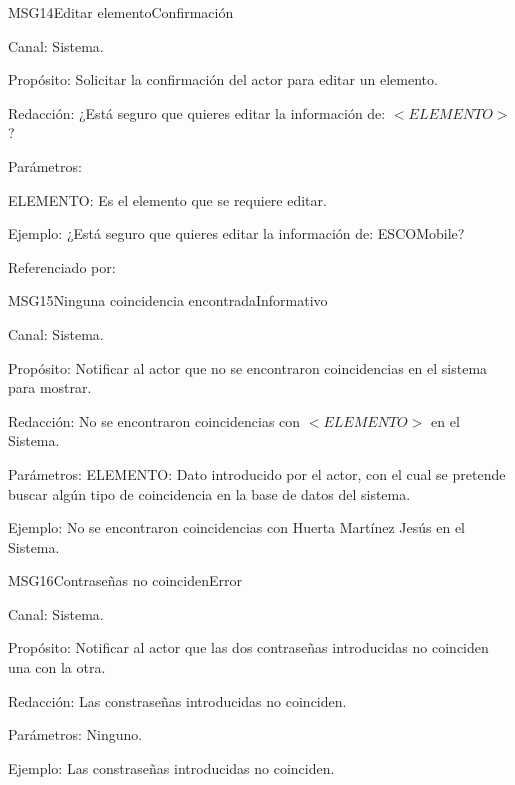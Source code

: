 \begin{mensaje}{MSG14}{Editar elemento}{Confirmación}
	\item[Canal:] Sistema.
    \item[Propósito:] Solicitar la confirmación del actor para editar un elemento.
    \item[Redacción:] ¿Está seguro que quieres editar la información de: $<ELEMENTO>$?
    \item[Parámetros:] \item ELEMENTO: Es el elemento que se requiere editar.
    \item[Ejemplo:] ¿Está seguro que quieres editar la información de: ESCOMobile?
	\item[Referenciado por: ] 
\end{mensaje}

\begin{mensaje}{MSG15}{Ninguna coincidencia encontrada}{Informativo}
	\item[Canal:] Sistema.
    \item[Propósito:] Notificar al actor que no se encontraron coincidencias en el sistema para mostrar.
    \item[Redacción:] No se encontraron coincidencias con $<ELEMENTO>$ en el Sistema.
    \item[Parámetros:] ELEMENTO: Dato introducido por el actor, con el cual se pretende buscar algún tipo de coincidencia en la base de datos del sistema.
    \item[Ejemplo:] No se encontraron coincidencias con Huerta Martínez Jesús en el Sistema.
\end{mensaje}

\begin{mensaje}{MSG16}{Contraseñas no coinciden}{Error}
	\item[Canal:] Sistema.
    \item[Propósito:] Notificar al actor que las dos contraseñas introducidas no coinciden una con la otra.
    \item[Redacción:] Las constraseñas introducidas no coinciden.
    \item[Parámetros:] Ninguno.
    \item[Ejemplo:] Las constraseñas introducidas no coinciden.
\end{mensaje}

